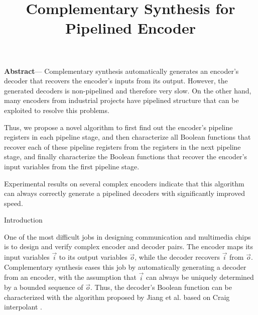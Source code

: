 \documentclass[twocolumn]{article}
\makeatletter
\def\section{\@startsection {section}{1}{\z@}{20pt plus 2pt minus 2pt}
{8pt plus 2pt minus 2pt}{\centering\normalsize\sc
\edef\@svsec{\thesection.\ }}}
\def\thesection{\Roman{section}}
\makeatother
\begin{document}
\date{}

\title{\Large\textbf{Complementary Synthesis for Pipelined Encoder}
}	%


\author{
}
\maketitle
\thispagestyle{empty}

{\small
\textbf{
Abstract}---
Complementary synthesis automatically generates an encoder's decoder
that recovers the encoder's inputs from its output.
However,
the generated decoders is non-pipelined 
and therefore very slow.
On the other hand,
many encoders from industrial projects have pipelined structure 
that can be exploited to resolve this problems.

Thus,
we propose a novel algorithm to first find out the encoder's pipeline registers in each pipeline stage,
and then characterize all Boolean functions that recover each of these pipeline registers
from the registers in the next pipeline stage,
and finally characterize the Boolean functions that recover the encoder's input variables 
from the first pipeline stage.

Experimental results on several complex encoders indicate that
this algorithm can always correctly generate a pipelined decoders with significantly
improved speed.
}

\section{Introduction}

One of the most difficult jobs in designing communication
and multimedia chips is to design and verify complex encoder and decoder pairs.
The encoder maps its input variables $\vec{i}$ to its output variables $\vec{o}$,
while the decoder recovers $\vec{i}$ from $\vec{o}$.
Complementary synthesis 
\cite{ShenICCAD09,ShenTCAD10,ShenTCAD11,ShenTCAD12,LiuICCAD11,LiuTCAD12,TuDAC13}
eases this job by
automatically generating a decoder from an encoder,
with the assumption that $\vec{i}$ can always be
uniquely determined by a bounded sequence of $\vec{o}$.
Thus,
the decoder's Boolean function can be characterized
with the algorithm proposed by Jiang et al. \cite{InterpBoolFunction}
based on Craig interpolant \cite{Craig}.
\end{document}

